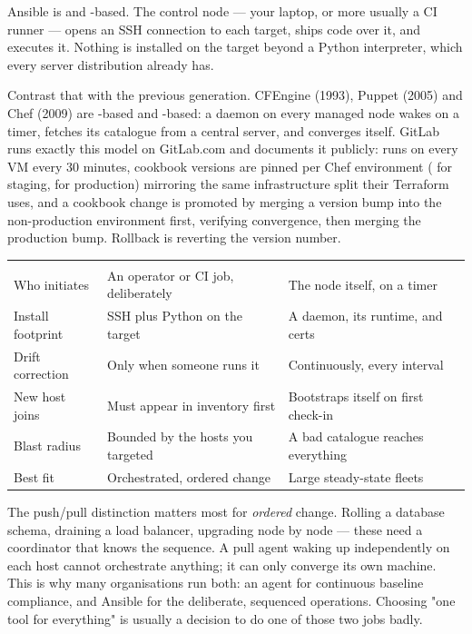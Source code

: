  Ansible is  and -based. The control node --- your laptop, or more usually a CI runner --- opens an SSH connection to each target, ships code over it, and executes it. Nothing is installed on the target beyond a Python interpreter, which every server distribution already has.

Contrast that with the previous generation. CFEngine (1993), Puppet (2005) and Chef (2009) are -based and -based: a daemon on every managed node wakes on a timer, fetches its catalogue from a central server, and converges itself. GitLab runs exactly this model on GitLab.com and documents it publicly:  runs on every VM every 30 minutes, cookbook versions are pinned per Chef environment ( for staging,  for production) mirroring the same infrastructure split their Terraform uses, and a cookbook change is promoted by merging a version bump into the non-production environment first, verifying convergence, then merging the production bump. Rollback is reverting the version number.

\begin{center}\small
\wbrowcolors
\begin{tabularx}{\linewidth}{@{}L{26mm} X X@{}}
 &  & \\
Who initiates & An operator or CI job, deliberately & The node itself, on a timer\\
Install footprint & SSH plus Python on the target & A daemon, its runtime, and certs\\
Drift correction & Only when someone runs it & Continuously, every interval\\
New host joins & Must appear in inventory first & Bootstraps itself on first check-in\\
Blast radius & Bounded by the hosts you targeted & A bad catalogue reaches everything\\
Best fit & Orchestrated, ordered change & Large steady-state fleets\\
\end{tabularx}
\end{center}

\begin{seniornote}
The push/pull distinction matters most for \emph{ordered} change. Rolling a database schema, draining a load balancer, upgrading node by node --- these need a coordinator that knows the sequence. A pull agent waking up independently on each host cannot orchestrate anything; it can only converge its own machine. This is why many organisations run both: an agent for continuous baseline compliance, and Ansible for the deliberate, sequenced operations. Choosing "one tool for everything" is usually a decision to do one of those two jobs badly.
\end{seniornote}

